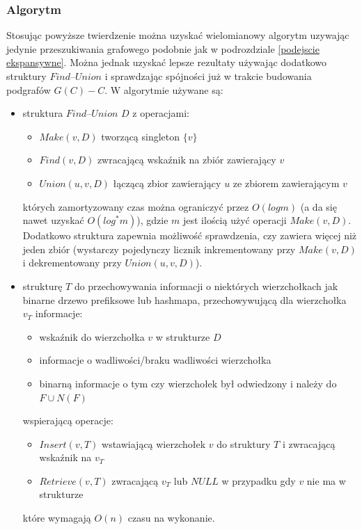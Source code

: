 \documentclass{pracamgr}
\begin{document}
    \subsubsection{Algorytm}
     Stosując powyższe twierdzenie można uzyskać wielomianowy algorytm uzywając jedynie przeszukiwania grafowego
     podobnie jak w podrozdziale \ref{podejscie ekspansywne}. Można jednak uzyskać lepsze rezultaty używając dodatkowo struktury $Find$--$Union$ i sprawdzając
     spójności już w trakcie budowania podgrafów $G(C)-C$.\newline
     W algorytmie używane są:
     \begin{itemize}
      \item struktura $Find$--$Union$ $D$ z operacjami:
       \begin{itemize}
        \item $Make(v,D)$ tworzącą singleton $\{v\}$
        \item $Find(v,D)$ zwracającą wskaźnik na zbiór zawierający $v$
        \item $Union(u,v,D)$ łączącą zbior zawierający $u$ ze zbiorem zawierającym $v$
       \end{itemize}
       których zamortyzowany czas można ograniczyć przez $O(log m)$ (a da się nawet uzyskać $O(log^*m)$), gdzie $m$ jest ilością użyć
       operacji $Make(v,D)$.
       Dodatkowo struktura zapewnia możliwość sprawdzenia, czy zawiera więcej niż jeden zbiór (wystarczy pojedynczy licznik inkrementowany przy
       $Make(v,D)$ i dekrementowany przy $Union(u,v,D)$).
      \item strukturę $T$ do przechowywania informacji o niektórych wierzchołkach jak binarne drzewo prefiksowe lub hashmapa,
       przechowywującą dla wierzchołka $v_T$ informacje:
       \begin{itemize}
        \item wskaźnik do wierzchołka $v$ w strukturze $D$
        \item informacje o wadliwości/braku wadliwości wierzchołka
        \item binarną informacje o tym czy wierzchołek był odwiedzony i należy do $F\cup N(F)$
       \end{itemize}
       wspierającą operacje:
       \begin{itemize}
        \item $Insert(v,T)$ wstawiającą wierzchołek $v$ do struktury $T$ i zwracającą wskaźnik na $v_T$
        \item $Retrieve(v,T)$ zwracającą $v_T$ lub $NULL$ w przypadku gdy $v$ nie ma w strukturze
       \end{itemize}
       które wymagają $O(n)$ czasu na wykonanie.
     \end{itemize}
     
\end{document}
